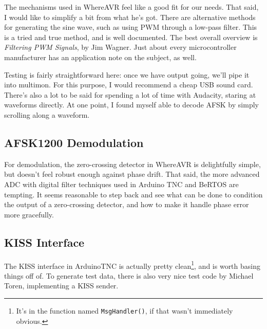 The mechanisms used in WhereAVR feel like a good fit for our needs.
That said, I would like to simplify a bit from what he's got.  There
are alternative methods for generating the sine wave, such as using
PWM through a low-pass filter.  This is a tried and true method, and
is well documented.  The best overall overview is \textit{Filtering
  PWM Signals}\cite{WagnerPWM}, by Jim Wagner.  Just about every
microcontroller manufacturer has an application note on the subject,
as well.

Testing is fairly straightforward here: once we have output going,
we'll pipe it into multimon.  For this purpose, I would recommend a
cheap USB sound card.  There's also a lot to be said for spending a
lot of time with Audacity, staring at waveforms directly.  At one
point, I found myself able to decode AFSK by simply scrolling along a
waveform.

\subsection{AFSK1200 Demodulation}

For demodulation, the zero-crossing detector in WhereAVR is
delightfully simple, but doesn't feel robust enough against phase
drift.  That said, the more advanced ADC with digital filter
techniques used in Arduino TNC and BeRTOS are tempting.  It seems
reasonable to step back and see what can be done to condition the
output of a zero-crossing detector, and how to make it handle phase
error more gracefully.

\subsection{KISS Interface}

The KISS interface in ArduinoTNC is actually pretty clean\footnote{
  It's in the function named \texttt{MsgHandler()}, if that wasn't
  immediately obvious.}, and is worth basing things off of.  To
generate test data, there is also very nice test code by Michael
Toren, implementing a KISS sender\cite{BacchusKISS}.
